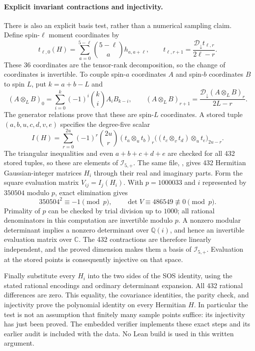 \documentclass[11pt,a4paper]{article}
\begin{document}
\paragraph{Explicit invariant contractions and injectivity.}
There is also an explicit basis test, rather than a numerical sampling
claim. Define spin-$\ell$ moment coordinates by
\[
 t_{\ell,0}(H)=\sum_{a=0}^{5-\ell}\binom{5-\ell}{a}h_{a,a+\ell},
 \qquad t_{\ell,r+1}=
 \frac{\mathcal D_{\downarrow}t_{\ell,r}}{2\ell-r}.
\]
These $36$ coordinates are the tensor-rank decomposition, so the
change of coordinates is invertible. To couple spin-$a$ coordinates
$A$ and spin-$b$ coordinates $B$ to spin $L$, put $k=a+b-L$ and
\[
 (A\mathbin{\otimes_L}B)_0=
 \sum_{i=0}^k(-1)^i\binom ki A_iB_{k-i},\qquad
 (A\mathbin{\otimes_L}B)_{r+1}=
 \frac{\mathcal D_{\downarrow}(A\mathbin{\otimes_L}B)_r}{2L-r}.
\]
The generator relations prove that these are spin-$L$ coordinates.
A stored tuple $(a,b,u,c,d,v,e)$ specifies the degree-five scalar
\[
 I(H)=\sum_{r=0}^{2u}(-1)^r\binom{2u}{r}
 (t_a\mathbin{\otimes_u}t_b)_r
 \bigl((t_c\mathbin{\otimes_v}t_d)\mathbin{\otimes_u}t_e\bigr)_{2u-r}.
\]
The triangular inequalities and even $a+b+c+d+e$ are checked for all
432 stored tuples, so these are elements of $\mathcal I_{5,+}$.
The same file, , gives 432
Hermitian Gaussian-integer matrices $H_i$ through their real and
imaginary parts. Form the square evaluation matrix $V_{ij}=I_j(H_i)$.
With $p=1000033$ and $i$ represented by $350504$ modulo $p$, exact
elimination gives
\[
 350504^2\equiv-1\pmod p,\qquad \det V\equiv486549\not\equiv0\pmod p.
\]
Primality of $p$ can be checked by trial division up to $1000$; all
rational denominators in this computation are invertible modulo $p$.
A nonzero modular determinant implies a nonzero determinant over
$\mathbb Q(i)$, and hence an invertible evaluation matrix over $\mathbb C$.
The 432 contractions are therefore linearly independent, and the
proved dimension makes them a basis of $\mathcal I_{5,+}$.
Evaluation at the stored points is consequently injective on that space.

Finally substitute every $H_i$ into the two sides of the SOS identity,
using the stated rational encodings and ordinary determinant expansion.
All 432 rational differences are zero. This equality, the covariance
identities, the parity check, and injectivity prove the polynomial
identity on every Hermitian $H$. In particular the test is not an
assumption that finitely many sample points suffice: its injectivity
has just been proved. The embedded verifier implements these exact
steps and its earlier audit is included with the data. No Lean build
is used in this written argument.
\end{document}
